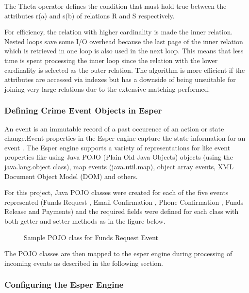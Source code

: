 \noindent The Theta operator defines the condition that must hold true between the attributes r(a) and s(b) of relations R and S respectively.

\noindent For efficiency, the relation with higher cardinality is made the inner relation. Nested loops save some I/O overhead because the last page of the inner relation which is retrieved in one loop is also used in the next loop. This means that less time is spent processing the inner loop since the relation with the lower cardinality is selected as the outer relation. The algorithm is more efficient if the attributes are accessed via indexes but has a downside of being unsuitable for joining very large relations due to the extensive matching performed.


\subsubsection{Defining Crime Event Objects in Esper}

\noindent An event is an immutable record of a past occurence of an action or state change.Event properties  in the Esper engine capture the state information for an event \cite{twentyfive}.
The Esper engine supports a variety of representations for like event properties like using Java POJO (Plain Old Java Objects) objects (using the java.lang.object class), map events (java.util.map), object array events, XML  Document Object Model (DOM) and others.

\noindent For this project, Java POJO classes were created for each of the  five events represented (Funds Request , Email Confirmation , Phone Confirmation , Funds Release and Payments) and the required fields were defined for each class with both getter and setter methods as in the figure below.

\begin{center}
\begin{figure}[h]
\caption{Sample POJO class for Funds Request Event}

\end{figure}
\end{center}

\noindent The POJO classes are then mapped to the esper engine during processing of incoming events as described in the following section.

\subsubsection{Configuring the Esper Engine}

